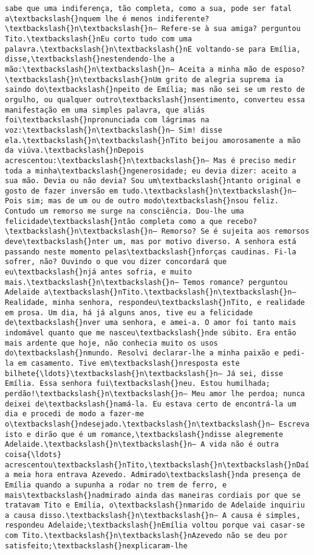 \begin{Verbatim}[commandchars=\\\{\}]
sabe que uma indiferença, tão completa, como a sua, pode ser fatal a\textbackslash{}nquem lhe é menos indiferente?\textbackslash{}n\textbackslash{}n— Refere-se à sua amiga? perguntou Tito.\textbackslash{}nEu corto tudo com uma palavra.\textbackslash{}n\textbackslash{}nE voltando-se para Emília, disse,\textbackslash{}nestendendo-lhe a mão:\textbackslash{}n\textbackslash{}n— Aceita a minha mão de esposo?\textbackslash{}n\textbackslash{}nUm grito de alegria suprema ia saindo do\textbackslash{}npeito de Emília; mas não sei se um resto de orgulho, ou qualquer outro\textbackslash{}nsentimento, converteu essa manifestação em uma simples palavra, que aliás foi\textbackslash{}npronunciada com lágrimas na voz:\textbackslash{}n\textbackslash{}n— Sim! disse ela.\textbackslash{}n\textbackslash{}nTito beijou amorosamente a mão da viúva.\textbackslash{}nDepois acrescentou:\textbackslash{}n\textbackslash{}n— Mas é preciso medir toda a minha\textbackslash{}ngenerosidade; eu devia dizer: aceito a sua mão. Devia ou não devia? Sou um\textbackslash{}ntanto original e gosto de fazer inversão em tudo.\textbackslash{}n\textbackslash{}n— Pois sim; mas de um ou de outro modo\textbackslash{}nsou feliz. Contudo um remorso me surge na consciência. Dou-lhe uma felicidade\textbackslash{}ntão completa como a que recebo?\textbackslash{}n\textbackslash{}n— Remorso? Se é sujeita aos remorsos deve\textbackslash{}nter um, mas por motivo diverso. A senhora está passando neste momento pelas\textbackslash{}nforças caudinas. Fi-la sofrer, não? Ouvindo o que vou dizer concordará que eu\textbackslash{}njá antes sofria, e muito mais.\textbackslash{}n\textbackslash{}n— Temos romance? perguntou Adelaide a\textbackslash{}nTito.\textbackslash{}n\textbackslash{}n— Realidade, minha senhora, respondeu\textbackslash{}nTito, e realidade em prosa. Um dia, há já alguns anos, tive eu a felicidade de\textbackslash{}nver uma senhora, e amei-a. O amor foi tanto mais indomável quanto que me nasceu\textbackslash{}nde súbito. Era então mais ardente que hoje, não conhecia muito os usos do\textbackslash{}nmundo. Resolvi declarar-lhe a minha paixão e pedi-la em casamento. Tive em\textbackslash{}nresposta este bilhete{\ldots}\textbackslash{}n\textbackslash{}n— Já sei, disse Emília. Essa senhora fui\textbackslash{}neu. Estou humilhada; perdão!\textbackslash{}n\textbackslash{}n— Meu amor lhe perdoa; nunca deixei de\textbackslash{}namá-la. Eu estava certo de encontrá-la um dia e procedi de modo a fazer-me o\textbackslash{}ndesejado.\textbackslash{}n\textbackslash{}n— Escreva isto e dirão que é um romance,\textbackslash{}ndisse alegremente Adelaide.\textbackslash{}n\textbackslash{}n— A vida não é outra coisa{\ldots} acrescentou\textbackslash{}nTito,\textbackslash{}n\textbackslash{}nDaí a meia hora entrava Azevedo. Admirado\textbackslash{}nda presença de Emília quando a supunha a rodar no trem de ferro, e mais\textbackslash{}nadmirado ainda das maneiras cordiais por que se tratavam Tito e Emília, o\textbackslash{}nmarido de Adelaide inquiriu a causa disso.\textbackslash{}n\textbackslash{}n— A causa é simples, respondeu Adelaide;\textbackslash{}nEmília voltou porque vai casar-se com Tito.\textbackslash{}n\textbackslash{}nAzevedo não se deu por satisfeito;\textbackslash{}nexplicaram-lhe 
\end{Verbatim}
